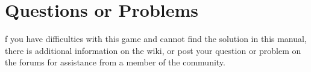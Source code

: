 \documentclass[openany]{book}
\begin{document}
\section{Questions or Problems}

f you have difficulties with this game and cannot find the solution in this manual, there is additional information on the wiki, or post your question or problem on the forums for assistance from a member of the community.

\tableofcontents

\mainmatter























\backmatter

\cleardoublepage
{}
\printindex
\end{document}
